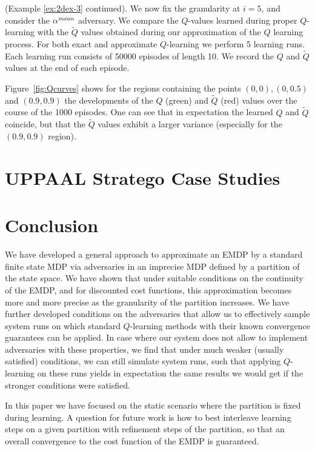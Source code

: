 \documentclass{llncs}
\begin{document}
\begin{example}
\label{ex:2dex-4}
(Example \ref{ex:2dex-3} continued). We now fix the granularity at $i=5$, and 
consider the $\alpha^{\emph{mean}}$ adversary.  We compare the $Q$-values learned during proper $Q$-learning with
the $\tilde{Q}$ values obtained during our approximation of the $Q$ learning process. 
For both exact and approximate $Q$-learning we perform 5 learning
runs. Each learning run consists of 50000 episodes of length 10.
We record the $Q$ and $\tilde{Q}$ values
at the end of each episode. 

Figure~\ref{fig:Qcurves} shows for the regions containing the points $(0,0), (0,0.5)$ and $(0.9,0.9)$
the developments of the
$Q$ (green) and $\tilde{Q}$ (red) values over the course of the 1000 episodes. One can see that in expectation
the learned $Q$ and $\tilde{Q}$ coincide, but that the  $\tilde{Q}$ values exhibit a larger variance (especially
for the $(0.9,0.9)$ region). 
\end{example}



\section{UPPAAL Stratego Case Studies}

\section{Conclusion}

We have developed a general approach to approximate an EMDP  by a standard finite
state MDP via adversaries in an imprecise MDP defined by a partition of the state space.
We have shown that under suitable conditions on the
continuity of the EMDP, and for discounted cost functions, this approximation becomes
more and more precise as the granularity of the partition increases. We have further developed
conditions on the adversaries that allow us to effectively sample system runs on which standard
$Q$-learning methods with their known convergence guarantees can be applied. In case where
our system does not allow to implement adversaries with these properties, we find that under
much weaker (usually satisfied) conditions, we can still simulate system runs, such that applying
$Q$-learning on these runs yields in expectation the same results we would get if the stronger
conditions were satisfied.

In this paper we have focused on the static scenario where the partition is fixed during learning.
A question for future work is how to best interleave learning steps on a given partition with
refinement steps of the partition, so that an overall convergence to the cost function of the
EMDP is guaranteed.






%
\end{document}
